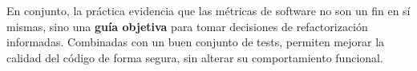 \documentclass{article}
\begin{document}
En conjunto, la práctica evidencia que las métricas de software no son un fin en sí
mismas, sino una \textbf{guía objetiva} para tomar decisiones de refactorización
informadas. Combinadas con un buen conjunto de tests, permiten mejorar la calidad
del código de forma segura, sin alterar su comportamiento funcional.
\end{document}
